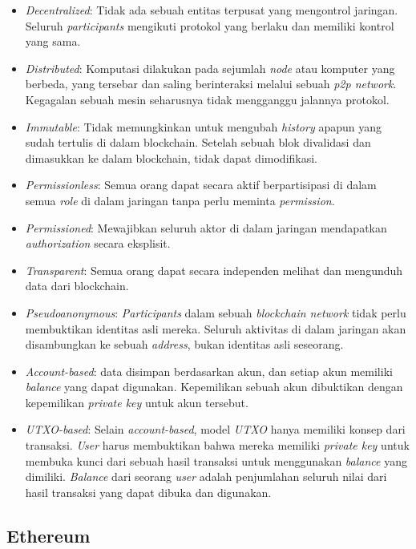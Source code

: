 \begin{itemize}
	\item \textit{Decentralized}: Tidak ada sebuah entitas terpusat yang mengontrol jaringan. Seluruh \textit{participants} mengikuti protokol yang berlaku dan memiliki kontrol yang sama.
	\item \textit{Distributed}: Komputasi dilakukan pada sejumlah \textit{node} atau komputer yang berbeda, yang tersebar dan saling berinteraksi melalui sebuah \textit{p2p network}. Kegagalan sebuah mesin seharusnya tidak mengganggu jalannya protokol.
	\item \textit{Immutable}: Tidak memungkinkan untuk mengubah \textit{history} apapun yang sudah tertulis di dalam blockchain. Setelah sebuah blok divalidasi dan dimasukkan ke dalam blockchain, tidak dapat dimodifikasi.
	\item \textit{Permissionless}: Semua orang dapat secara aktif berpartisipasi di dalam semua \textit{role} di dalam jaringan tanpa perlu meminta \textit{permission}.
	\item \textit{Permissioned}: Mewajibkan seluruh aktor di dalam jaringan mendapatkan \textit{authorization} secara eksplisit.
	\item \textit{Transparent}: Semua orang dapat secara independen melihat dan mengunduh data dari blockchain.
	\item \textit{Pseudoanonymous}: \textit{Participants} dalam sebuah \textit{blockchain network} tidak perlu membuktikan identitas asli mereka. Seluruh aktivitas di dalam jaringan akan disambungkan ke sebuah \textit{address}, bukan identitas asli seseorang.
	\item \textit{Account-based}: data disimpan berdasarkan akun, dan setiap akun memiliki \textit{balance} yang dapat digunakan. Kepemilikan sebuah akun dibuktikan dengan kepemilikan \textit{private key} untuk akun tersebut.
	\item \textit{UTXO-based}: Selain \textit{account-based}, model \textit{UTXO} hanya memiliki konsep dari transaksi. \textit{User} harus membuktikan bahwa mereka memiliki \textit{private key} untuk membuka kunci dari sebuah hasil transaksi untuk menggunakan \textit{balance} yang dimiliki. \textit{Balance} dari seorang \textit{user} adalah penjumlahan seluruh nilai dari hasil transaksi yang dapat dibuka dan digunakan.
\end{itemize}

\subsection{Ethereum}
\label{subsec:ethereum}

